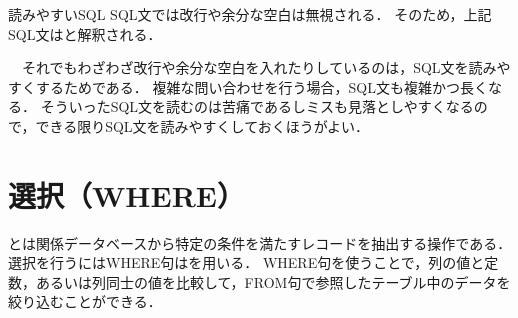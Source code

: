 \begin{table}[tb]
    \centering
    \caption{}
    \label{tb:}
\end{table}

\begin{tipbox}{読みやすいSQL}
SQL文では改行や余分な空白は無視される．
そのため，上記SQL文はと解釈される．

　それでもわざわざ改行や余分な空白を入れたりしているのは，SQL文を読みやすくするためである．
複雑な問い合わせを行う場合，SQL文も複雑かつ長くなる．
そういったSQL文を読むのは苦痛であるしミスも見落としやすくなるので，できる限りSQL文を読みやすくしておくほうがよい．
\end{tipbox}


\section{選択（WHERE）}
とは関係データベースから特定の条件を満たすレコードを抽出する操作である．
選択を行うにはWHERE句はを用いる．
WHERE句を使うことで，列の値と定数，あるいは列同士の値を比較して，FROM句で参照したテーブル中のデータを絞り込むことができる．


